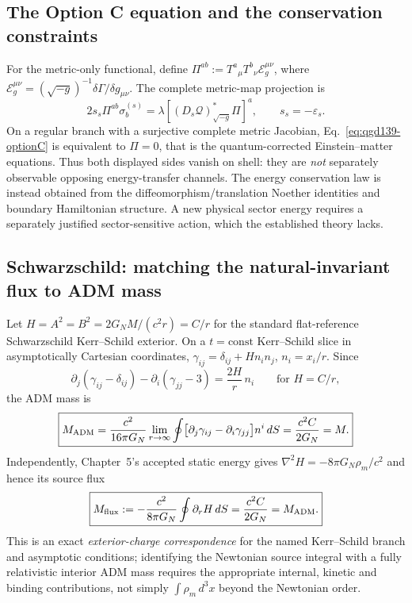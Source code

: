 \documentclass[11pt,a4paper]{article}
\begin{document}
\subsection{The Option C equation and the conservation constraints}
For the metric-only functional, define $\Pi^{ab}:=T^a{}_{\mu}T^b{}_{\nu}\mathcal E_g^{\mu\nu}$,
where $\mathcal E_g^{\mu\nu}=(\sqrt{-g})^{-1}\delta\Gamma/\delta g_{\mu\nu}$.
The complete metric-map projection is
\begin{equation}\label{eq:qgd139-optionC}
\boxed{2s_s\Pi^{ab}\sigma_b^{(s)}=
\lambda[(D_s\mathcal Q)^*_{\sqrt{-g}}\Pi]^a,\qquad s_s=-\varepsilon_s.}
\end{equation}
On a regular branch with a surjective complete metric Jacobian,
Eq.~\eqref{eq:qgd139-optionC} is equivalent to $\Pi=0$, that is the
quantum-corrected Einstein--matter equations. Thus both displayed sides
vanish on shell: they are \emph{not} separately observable opposing
energy-transfer channels. The energy conservation law is instead obtained
from the diffeomorphism/translation Noether identities and boundary
Hamiltonian structure. A new physical sector energy requires a separately
justified sector-sensitive action, which the established theory lacks.

\subsection{Schwarzschild: matching the natural-invariant flux to ADM mass}
Let $H=A^2=B^2=2G_NM/(c^2r)=C/r$ for the standard flat-reference
Schwarzschild Kerr--Schild exterior. On a $t=\mathrm{const}$ Kerr--Schild
slice in asymptotically Cartesian coordinates, $\gamma_{ij}=\delta_{ij}+Hn_in_j$,
$n_i=x_i/r$. Since
\begin{equation}\label{eq:qgd139-adm-integrand}
\partial_j(\gamma_{ij}-\delta_{ij})
-\partial_i(\gamma_{jj}-3)=\frac{2H}{r}\,n_i
\qquad\text{for }H=C/r,
\end{equation}
the ADM mass is
\begin{equation}\label{eq:qgd139-adm}
\boxed{M_{\rm ADM}=\frac{c^2}{16\pi G_N}
\lim_{r\to\infty}\oint
\bigl[\partial_j\gamma_{ij}-\partial_i\gamma_{jj}\bigr]n^i\,dS
=\frac{c^2 C}{2G_N}=M.}
\end{equation}
Independently, Chapter~5's accepted static energy gives
$\nabla^2H=-8\pi G_N\rho_m/c^2$ and hence its source flux
\begin{equation}\label{eq:qgd139-flux}
\boxed{M_{\rm flux}:=-\frac{c^2}{8\pi G_N}
\oint \partial_rH\,dS=\frac{c^2C}{2G_N}=M_{\rm ADM}.}
\end{equation}
This is an exact \emph{exterior-charge correspondence} for the named
Kerr--Schild branch and asymptotic conditions; identifying the Newtonian
source integral with a fully relativistic interior ADM mass requires the
appropriate internal, kinetic and binding contributions, not simply
$\int\rho_m\,d^3x$ beyond the Newtonian order.
\end{document}
